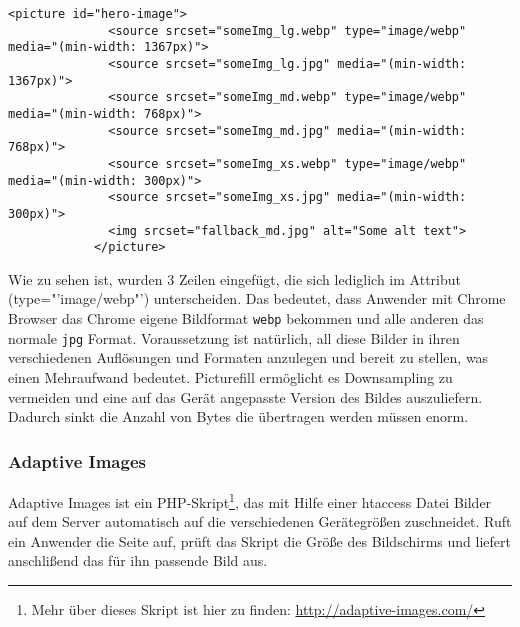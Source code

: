 			\begin{lstlisting}[captionpos=b, caption=Srcset mit webp, label=lst:srcsetWebp]
			<picture id="hero-image">
			  <source srcset="someImg_lg.webp" type="image/webp" media="(min-width: 1367px)">
			  <source srcset="someImg_lg.jpg" media="(min-width: 1367px)">
			  <source srcset="someImg_md.webp" type="image/webp" media="(min-width: 768px)">
			  <source srcset="someImg_md.jpg" media="(min-width: 768px)">
			  <source srcset="someImg_xs.webp" type="image/webp" media="(min-width: 300px)">
			  <source srcset="someImg_xs.jpg" media="(min-width: 300px)">
			  <img srcset="fallback_md.jpg" alt="Some alt text">
			</picture>
			\end{lstlisting}

			Wie zu sehen ist, wurden 3 Zeilen eingefügt, die sich lediglich im Attribut (type="'image/webp"') unterscheiden. Das bedeutet, dass Anwender mit Chrome Browser das Chrome eigene Bildformat \texttt{webp} bekommen und alle anderen das normale \texttt{jpg} Format. Voraussetzung ist natürlich, all diese Bilder in ihren verschiedenen Auflösungen und Formaten anzulegen und bereit zu stellen, was einen Mehraufwand bedeutet.
			Picturefill ermöglicht es Downsampling zu vermeiden und eine auf das Gerät angepasste Version des Bildes auszuliefern. Dadurch sinkt die Anzahl von Bytes die übertragen werden müssen enorm.


		\subsubsection{Adaptive Images} %
		\label{ssub:adaptive_images}
			Adaptive Images ist ein PHP-Skript\footnote{Mehr über dieses Skript ist hier zu finden: \url{http://adaptive-images.com/}}, das mit Hilfe einer htaccess Datei Bilder auf dem Server automatisch auf die verschiedenen Gerätegrößen zuschneidet. Ruft ein Anwender die Seite auf, prüft das Skript die Größe des Bildschirms und liefert anschlißend das für ihn passende Bild aus. 



